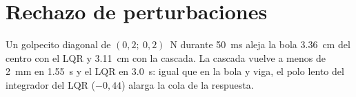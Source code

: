 \section{Rechazo de perturbaciones}

Un golpecito diagonal de $(0{,}2;\ 0{,}2)$~N durante \SI{50}{ms} aleja la bola \SI{3.36}{cm} del centro con el LQR y \SI{3.11}{cm} con la cascada. La cascada vuelve a menos de \SI{2}{mm} en \SI{1.55}{s} y el LQR en \SI{3.0}{s}: igual que en la bola y viga, el polo lento del integrador del LQR ($-0{,}44$) alarga la cola de la respuesta.
